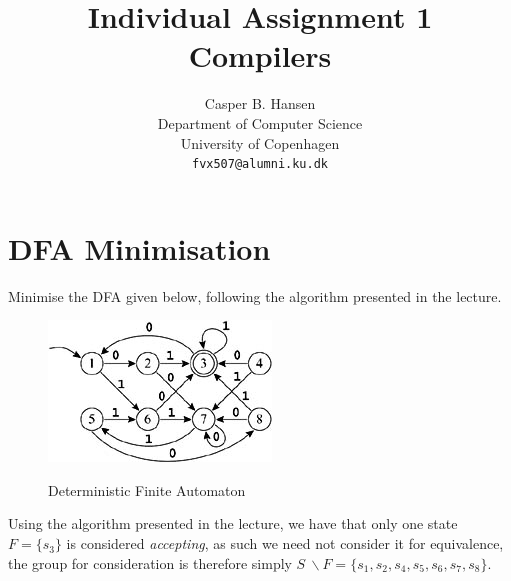 \documentclass[11pt,a4paper]{article}
\title
{
	{\large Individual Assignment 1}\\
	Compilers
}
\author
{
	Casper B. Hansen\\
	Department of Computer Science\\
	University of Copenhagen\\
	{\tt fvx507@alumni.ku.dk}
}
\begin{document}
\clearpage
\maketitle

\section{DFA Minimisation}
Minimise the DFA given below, following the algorithm presented in the
lecture.
\begin{figure}[H]
	\center
	\includegraphics[scale=1.0]{figures/dfatominimise}
	\label{fig:dfa-to-minimise}
	\caption{Deterministic Finite Automaton}
\end{figure}
Using the algorithm presented in the lecture, we have that only one state
$F = \{s_3\}$ is considered {\it accepting}, as such we need not consider
it for equivalence, the group for consideration is therefore simply $S{\ }
\backslash F = \{s_1,s_2,s_4,s_5,s_6,s_7,s_8\}$.
\end{document}
